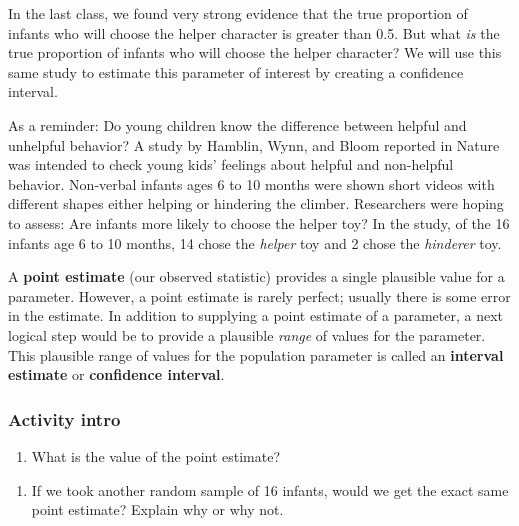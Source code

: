 \documentclass[
]{report}
\providecommand{\tightlist}{%
  \setlength{\itemsep}{0pt}\setlength{\parskip}{0pt}}
\begin{document}
In the last class, we found very strong evidence that the true proportion of infants who will choose the helper character is greater than 0.5. But what \emph{is} the true proportion of infants who will choose the helper character? We will use this same study to estimate this parameter of interest by creating a confidence interval.

As a reminder: Do young children know the difference between helpful and unhelpful behavior? A study by Hamblin, Wynn, and Bloom reported in Nature was intended to check young kids' feelings about helpful and non-helpful behavior. Non-verbal infants ages 6 to 10 months were shown short videos with different shapes either helping or hindering the climber. Researchers were hoping to assess: Are infants more likely to choose the helper toy? In the study, of the 16 infants age 6 to 10 months, 14 chose the \emph{helper} toy and 2 chose the \emph{hinderer} toy.

A \textbf{point estimate} (our observed statistic) provides a single plausible value for a parameter. However, a point estimate is rarely perfect; usually there is some error in the estimate. In addition to supplying a point estimate of a parameter, a next logical step would be to provide a plausible \emph{range} of values for the parameter. This plausible range of values for the population parameter is called an \textbf{interval estimate} or \textbf{confidence interval}.

\hypertarget{activity-intro}{%
\subsubsection*{Activity intro}\label{activity-intro}}

\begin{enumerate}
\def\labelenumi{\arabic{enumi}.}
\tightlist
\item
  What is the value of the point estimate?
\end{enumerate}

\vspace{0.5in}

\begin{enumerate}
\def\labelenumi{\arabic{enumi}.}
\setcounter{enumi}{1}
\tightlist
\item
  If we took another random sample of 16 infants, would we get the exact same point estimate? Explain why or why not.
\end{enumerate}
\end{document}

